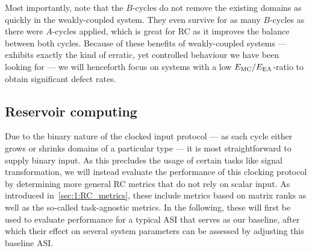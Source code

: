 \vspace{-1em}
\vspace{-1em}

Most importantly, note that the $B$-cycles do not remove the existing domains as quickly in the weakly-coupled system.
They even survive for as many $B$-cycles as there were $A$-cycles applied, which is great for RC as it improves the balance between both cycles.
Because of these benefits of weakly-coupled systems ---  exhibits exactly the kind of erratic, yet controlled behaviour we have been looking for --- we will henceforth focus on systems with a low $E_\mathrm{MC}/E_\mathrm{EA}$-ratio to obtain significant defect rates.

\subsection{Reservoir computing}
Due to the binary nature of the clocked input protocol --- as each cycle either grows or shrinks domains of a particular type --- it is most straightforward to supply binary input. %
As this precludes the usage of certain tasks like signal transformation, we will instead evaluate the performance of this clocking protocol by determining more general RC metrics that do not rely on scalar input.
As introduced in~\cref{sec:1:RC_metrics}, these include metrics based on matrix ranks as well as the so-called task-agnostic metrics.
In the following, these will first be used to evaluate performance for a typical ASI that serves as our baseline, after which their effect on several system parameters can be assessed by adjusting this baseline ASI.

